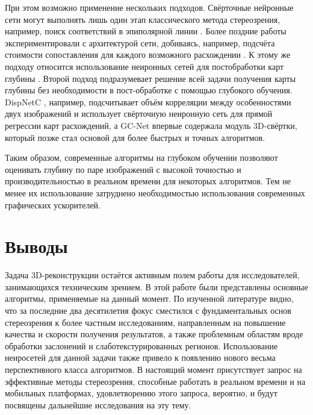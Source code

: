 При  этом возможно применение нескольких подходов. Свёрточные нейронные сети могут выполнять лишь один этап классического метода стереозрения, например, поиск соответствий в эпиполярной линии \cite{cnn_match}. Более поздние работы 
экспериментировали с архитектурой сети, добиваясь, например, подсчёта стоимости сопоставления для каждого возможного расхождении \cite{cnn_improv}.  К этому же подходу относится использование неиронных сетей для постобработки 
карт глубины \cite{cnn_post1}.  
Второй подход подразумевает решение всей задачи получения карты глубины без необходимости в пост-обработке с помощью глубокого обучения. DispNetC \cite{cnn_ete1}, например, подсчитывает объём корреляции между особенностями двух изображений и использует свёрточную неиронную сеть 
для прямой регрессии карт расхождений, а GC-Net \cite{gc_net} впервые содержала модуль 3D-свёртки, который позже стал основой для более быстрых и точных алгоритмов.   

Таким образом, современные алгоритмы на глубоком обучении позволяют оценивать глубину по паре изображений с высокой точностью и производительностью в реальном времени для некоторых алгоритмов. Тем не менее их использование затруднено 
необходимостью использования современных графических ускорителей. 


\section{Выводы}
\label{conclusion}

Задача 3D-реконструкции остаётся активным полем работы для исследователей, занимающихся техническим зрением. В этой работе были представлены основные алгоритмы, применяемые на данный момент. По изученной литературе видно, что за последние два десятилетия  
фокус сместился с фундаментальных основ стереозрения к более частным исследованиям, направленным на повышение качества и скорости получения результатов, а также проблемным областям вроде обработки заслонений и слаботекстурированных регионов. Использование неиросетей 
для данной задачи также привело к появлению нового весьма перспективного класса алгоритмов. В настоящий момент присутствует запрос на эффективные методы стереозрения, способные работать в реальном времени и на мобильных платформах, удовлетворению 
этого запроса, вероятно, и будут посвящены дальнейшие исследования на эту тему. 



\newpage




